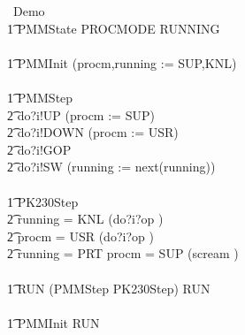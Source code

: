 \begin{circus}
\circprocess\ Demo \circdef \circbegin \\
\t1 \circstate PMMState  PROCMODE \land RUNNING \\
\\
\t1 PMMInit \circdef (procm,running := SUP,KNL) \\
\\
\t1 PMMStep \circdef \\
\t2             do?i!UP \then (procm := SUP) \circseq \Skip \\
\t2 \extchoice  do?i!DOWN \then (procm := USR) \circseq \Skip \\
\t2 \extchoice  do?i!GOP \then \Skip \\
\t2 \extchoice  do?i!SW \then (running := next(running)) \circseq \Skip \\
\\
\t1 PK230Step \circdef \\
\t2 \lcircguard running = KNL \rcircguard \circguard (do?i?op \then \Skip)\\
\t2 \extchoice \lcircguard procm = USR \rcircguard \circguard (do?i?op \then \Skip)\\
\t2 \extchoice \lcircguard running = PRT \land procm = SUP \rcircguard \circguard (scream \then \Stop)\\
\\
\t1 RUN \circdef (PMMStep \interleave PK230Step) \circseq RUN \\
\\
\t1 \circspot PMMInit \circseq RUN \\
\circend
\end{circus}
